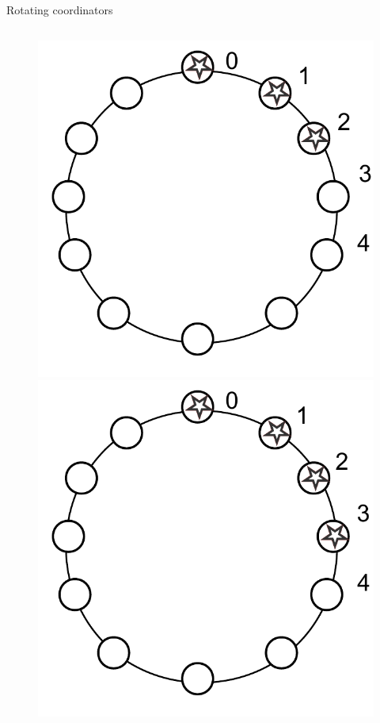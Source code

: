 \begin{frame}{Rotating coordinators}
\begin{columns}
\begin{column}{0.4\textwidth}
\begin{figure}
\begin{overprint}
			\includegraphics[width=\textwidth]{figs/07/rotating3}
			\onslide<5|handout:1>\includegraphics[width=\textwidth]{figs/07/rotating4}
		\end{overprint}
	\end{figure}
\end{column}
\end{columns}

\end{frame}


